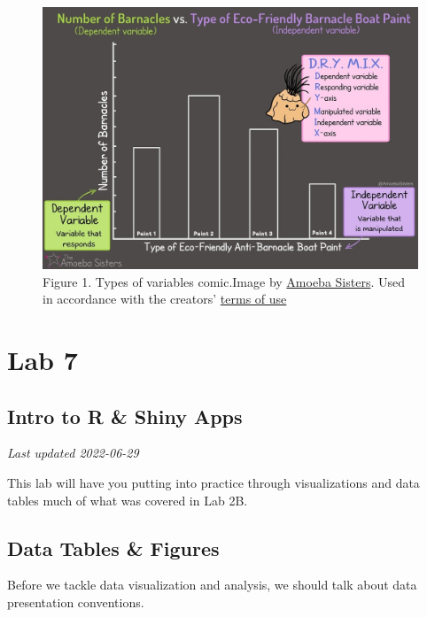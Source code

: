 \documentclass[
]{book}
\begin{document}
\begin{figure}
\centering
\includegraphics{figures_images/Lab6-Fig1.jpg}
\caption{Figure 1. Types of variables comic.Image by \href{https://www.amoebasisters.com/parameciumparlorcomics/category/nature-of-science/2}{Amoeba Sisters}. Used in accordance with the creators' \href{https://www.amoebasisters.com/termsofuse.html}{terms of use}}
\end{figure}

\hypertarget{part-lab-7}{%
\part*{Lab 7}\label{part-lab-7}}

\hypertarget{intro-to-r-shiny-apps}{%
\chapter*{Intro to R \& Shiny Apps}\label{intro-to-r-shiny-apps}}

\emph{Last updated 2022-06-29}

This lab will have you putting into practice through visualizations and data tables much of what was covered in Lab 2B.

\hypertarget{data-tables-figures}{%
\chapter*{Data Tables \& Figures}\label{data-tables-figures}}

Before we tackle data visualization and analysis, we should talk about data presentation conventions.
\end{document}
